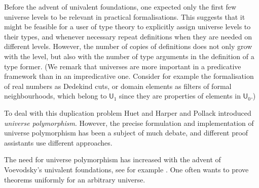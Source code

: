 \documentclass[11pt,a4paper]{article}
\def\UU{\mathsf{U}}
\def\Level{\mathsf{Level}}
\begin{document}
Before the advent of univalent foundations, one expected only the first few universe
 levels to be relevant in practical formalisations. This suggests that it might be feasible for a user of type theory to explicitly assign universe levels to their types, and whenever necessary repeat definitions when they are needed on different levels. However, the number of copies of definitions does not only grow with the level, but also with the number of type arguments in the definition of a type former. (We remark that universes are more important in a predicative framework than in an impredicative one. Consider for example the formalisation of real numbers as Dedekind cuts, or domain elements as filters of formal neighbourhoods, which belong to $\UU_1$ since they are properties of elements in $\UU_0$.)

 To deal with this duplication problem Huet \cite{Huet87} and Harper and Pollack \cite{HarperP91} introduced {\em universe polymorphism}. However, the precise formulation and implementation of universe polymorphism has been a subject of much debate, and different proof assistants use different approaches.

 The need for universe polymorphism has increased with the advent of Voevodsky's univalent foundations, see for example \cite{VV}. One often wants to prove theorems uniformly for an arbitrary universe.

\end{document}
